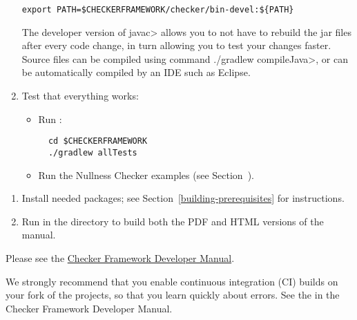 \begin{enumerate}
\begin{Verbatim}
export PATH=$CHECKERFRAMEWORK/checker/bin-devel:${PATH}
\end{Verbatim}

The developer version of \<javac> allows you to not have to rebuild
the jar files after every code change, in turn allowing you to test
your changes faster. Source files can be compiled using command \<./gradlew
compileJava>, or can be automatically compiled by
an IDE such as Eclipse.

\item Test that everything works:

  \begin{itemize}

  \item Run :
\begin{Verbatim}
  cd $CHECKERFRAMEWORK
  ./gradlew allTests
\end{Verbatim}

  \item Run the Nullness Checker examples (see
    Section~).

  \end{itemize}

\end{enumerate}



\begin{enumerate}
\item
Install needed packages; see Section~\ref{building-prerequisites} for
instructions.

\item
Run  in the  directory to build both the PDF and HTML versions of the manual.
\end{enumerate}



Please see the
\href{https://rawgit.com/typetools/checker-framework/master/docs/developer/developer-manual.html}{Checker Framework Developer Manual}.



We strongly recommend that you enable continuous integration (CI) builds on
your fork of the projects, so that you learn quickly about errors.  See the
 in the Checker Framework Developer Manual.

